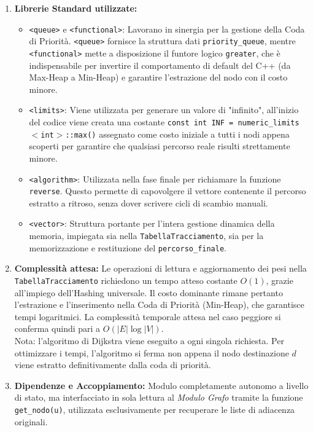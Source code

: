 \documentclass[12pt, a4paper]{article}
\begin{document}
\begin{enumerate}
\begin{itemize}
    \end{itemize}
    \item \textbf{Librerie Standard utilizzate:}
    \begin{itemize}
        \item[-] \texttt{<queue>} e \texttt{<functional>}: Lavorano in sinergia per la gestione della Coda di Priorità. \texttt{<queue>} fornisce la struttura dati \texttt{priority\_queue}, mentre \texttt{<functional>} mette a disposizione il funtore logico \texttt{greater}, che è indispensabile per invertire il comportamento di default del C++ (da Max-Heap a Min-Heap) e garantire l'estrazione del nodo con il costo minore.
        \item[-] \texttt{<limits>}: Viene utilizzata per generare un valore di "infinito", all'inizio del codice viene creata una costante \texttt{const int INF = numeric\_limits$<$int$>$::max()} assegnato come costo iniziale a tutti i nodi appena scoperti per garantire che qualsiasi percorso reale risulti strettamente minore.
        \item[-] \texttt{<algorithm>}: Utilizzata nella fase finale per richiamare la funzione \texttt{reverse}. Questo permette di capovolgere il vettore contenente il percorso estratto a ritroso, senza dover scrivere cicli di scambio manuali.
        \item[-] \texttt{<vector>}: Struttura portante per l'intera gestione dinamica della memoria, impiegata sia nella \texttt{TabellaTracciamento}, sia per la memorizzazione e restituzione del \texttt{percorso\_finale}.
    \end{itemize}
    \item \textbf{Complessità attesa:} Le operazioni di lettura e aggiornamento dei pesi nella \\ \texttt{TabellaTracciamento} richiedono un tempo atteso costante $O(1)$, grazie all'impiego dell'Hashing universale. Il costo dominante rimane pertanto l'estrazione e l'inserimento nella Coda di Priorità (Min-Heap), che garantisce tempi logaritmici. La complessità temporale attesa nel caso peggiore si conferma quindi pari a $O(|E| \log |V|)$. 
    \\ Nota: l'algoritmo di Dijkstra viene eseguito a ogni singola richiesta. Per ottimizzare i tempi, l'algoritmo si ferma non appena il nodo destinazione $d$ viene estratto definitivamente dalla coda di priorità.
    \item \textbf{Dipendenze e Accoppiamento:} Modulo completamente autonomo a livello di stato, ma interfacciato in sola lettura al \textit{Modulo Grafo} tramite la funzione \texttt{get\_nodo(u)}, utilizzata esclusivamente per recuperare le liste di adiacenza originali.
\end{enumerate}
\end{document}
